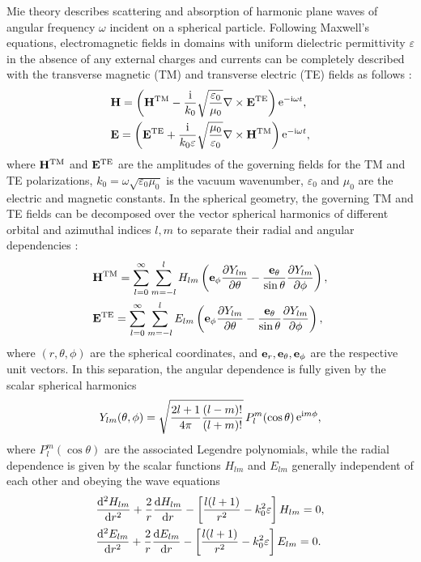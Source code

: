 \documentclass[aps,prb,reprint]{revtex4-2}
\renewcommand{\vec}[1]{{\bf #1}}
\renewcommand{\d}{{\rm d}}
\renewcommand{\i}{{\rm i}}
\newcommand{\pard}{{\rm\partial}}
\newcommand{\e}{\mathop{\rm e}\nolimits}
\begin{document}
Mie theory describes scattering and absorption of harmonic plane waves of angular frequency $\omega$ incident on a spherical particle. 
Following Maxwell's equations, electromagnetic fields in domains with uniform dielectric permittivity $\varepsilon$ in the absence of any external charges and currents can be completely described with the transverse magnetic (TM) and transverse electric (TE) fields as follows \cite{Li:2014,Png:2017}: 
\begin{eqnarray}
	&\displaystyle 
	\vec H=\left(\vec H^{\rm TM}-\frac{\i}{k_0} \sqrt{\frac{\varepsilon_0}{\mu_0}}\nabla\times \vec E^{\rm TE}\right)\e^{-\i\omega t},\label{H}\\
	&\displaystyle 
	\vec E=\left(\vec E^{\rm TE}+\frac{\i}{k_0\varepsilon}\sqrt{\frac{\mu_0}{\varepsilon_0}}\nabla\times \vec H^{\rm TM}\right)\e^{-\i\omega t},\label{E}
\end{eqnarray}
where $\vec H^{\rm TM}$ and $\vec E^{\rm TE}$ are the amplitudes of the governing fields for the TM and TE polarizations, $k_0=\omega\sqrt{\varepsilon_0\mu_0}$ is the vacuum wavenumber, $\varepsilon_0$ and $\mu_0$ are the electric and magnetic constants.
In the spherical geometry, the governing TM and TE fields can be decomposed over the vector spherical harmonics of different orbital and azimuthal indices $l, m$ to separate their radial and angular dependencies \cite{Li:2014,Png:2017}:
\begin{eqnarray}
	&\displaystyle 
	\vec H^{\rm TM}=\sum_{l=0}^\infty\sum_{m=-l}^l
{H}_{lm}\left(\vec e_\phi\frac{\pard Y_{lm}}{\pard \theta}-\frac{\vec e_\theta}{\sin \theta}\frac{\pard Y_{lm}}{\pard \phi}\right),\label{H_TM_lm}\\
	&\displaystyle 
	\vec E^{\rm TE}=\sum_{l=0}^\infty\sum_{m=-l}^l
{E}_{lm}\left(\vec e_\phi\frac{\pard Y_{lm}}{\pard \theta}-\frac{\vec e_\theta}{\sin \theta}\frac{\pard Y_{lm}}{\pard \phi}\right),\label{E_TE_lm}
\end{eqnarray}
where $(r,\theta,\phi)$ are the spherical coordinates, and $\vec e_r, \vec e_\theta, \vec e_\phi$ are the respective unit vectors.
In this separation, the angular dependence is fully given by the scalar spherical harmonics 
\begin{equation}
	Y_{lm}(\theta,\phi)=\sqrt{\frac{2l+1}{4\pi}\frac{(l-m)!}{(l+m)!}}\,
	P_l^m (\cos\theta)\e^{\i m\phi},
\end{equation}
where $P_l^m (\cos\theta)$ are the associated Legendre polynomials, while the radial dependence is given by the scalar functions ${H}_{lm}$ and ${E}_{lm}$ generally independent of each other and obeying the wave equations
\begin{eqnarray}
	&\displaystyle 
	\frac{\d^2 H_{lm}}{\d r^2}+\frac{2}{r}\frac{\d H_{lm}}{\d r}-\left[\frac{l(l+1)}{r^2}-k_0^2\varepsilon\right]H_{lm}=0, \label{WEd_H}\\
	&\displaystyle
		\frac{\d^2 E_{lm}}{\d r^2}+\frac{2}{r}\frac{\d E_{lm}}{\d r}-\left[\frac{l(l+1)}{r^2}-k_0^2\varepsilon\right]E_{lm}=0. \label{WEd_E}
\end{eqnarray}
 
\end{document}
